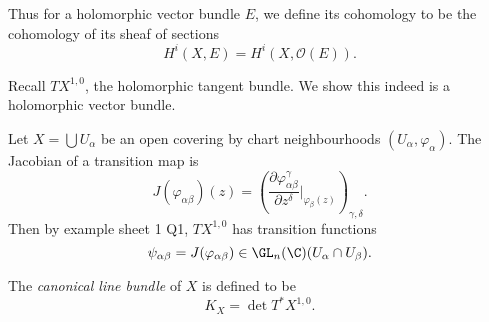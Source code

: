 \documentclass[a4paper]{article}
\begin{document}
Thus for a holomorphic vector bundle \(E\), we define its cohomology to be the cohomology of its sheaf of sections
\[
  H^i(X, E) = H^i(X, \mathcal O(E)).
\]

\begin{eg}
  Recall \(TX^{1, 0}\), the holomorphic tangent bundle. We show this indeed is a holomorphic vector bundle.

  Let \(X = \bigcup U_\alpha\) be an open covering by chart neighbourhoods \((U_\alpha, \varphi_\alpha)\). The Jacobian of a transition map is
  \[
    J(\varphi_{\alpha\beta})(z) = \left( \frac{\partial \varphi_{\alpha\beta}^\gamma}{\partial z^\delta}\Big|_{\varphi_\beta(z)} \right)_{\gamma, \delta}.
  \]
  Then by example sheet 1 Q1, \(TX^{1, 0}\) has transition functions
  \[
    \psi_{\alpha\beta} = J(\varphi_{\alpha\beta}) \in \GL_n(\C) (U_\alpha \cap U_\beta).
  \]

  \begin{definition}
    The \emph{canonical line bundle} of \(X\) is defined to be
    \[
      K_X = \det T^*X^{1, 0}.
    \]
\end{definition}
\end{eg}
\end{document}
